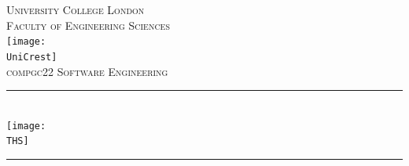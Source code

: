 \documentclass[fontsize=11pt]{extarticle}
\numberwithin{figure}{section} %
\numberwithin{table}{section}%
\newcommand{\ModuleTitle}{compgc22 Software Engineering}
\newcommand{\AssignmentTitle}{DIY Tool Hire Service}
\newcommand{\University}{University College London}
\newcommand{\Faculty}{Faculty of Engineering Sciences}
\newcommand{\UniCrest}{TempImg/logoucl.png}
\newcommand{\THS}{TempImg/logo.png}
\newcommand{\UniLogoHP}{TempImg/engLogo.jpg}%
\newcommand{\horrule}[1]{\rule{\linewidth}{#1}}
\begin{document}
% 

  \setlength{\abovedisplayskip}{-18pt}
  \setlength{\belowdisplayskip}{0pt}
  \setlength{\abovedisplayshortskip}{-18pt}
  \setlength{\belowdisplayshortskip}{0pt}



\begin{titlepage}

  \center %
    \normalfont \normalsize \textsc{\University} \\ [10pt]
    \normalfont \normalsize \textsc{\Faculty} \\ [25pt]
    
    \texttt{[image: \\UniCrest]}\\[0.5cm]
    
    \normalfont \normalsize \textsc{\ModuleTitle} \\ [10pt]
    \horrule{0.5pt} \\[0.4cm]
    \texttt{[image: \\THS]}\\[0.5cm]
    \horrule{2pt} \\[0.5cm]


\end{titlepage}
\end{document}
